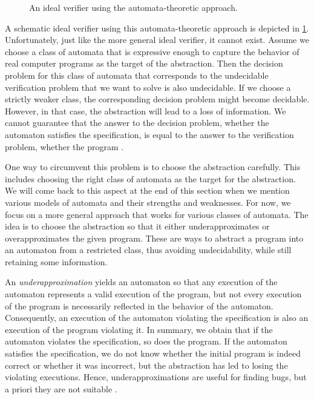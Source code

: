 \documentclass[../../diss.tex]{subfiles}
\begin{document}
\begin{figure}[t]
    \centering%
    
    \caption{An ideal verifier using the automata-theoretic approach.
    }%
    \label{Figure:IntroAutomata}%
\end{figure}

A schematic ideal verifier using this automata-theoretic approach is depicted in \cref{Figure:IntroAutomata}.
Unfortunately, just like the more general ideal verifier, it cannot exist.
Assume we choose a class of automata that is expressive enough to capture the behavior of real computer programs as the target of the abstraction.
Then the decision problem for this class of automata that corresponds to the undecidable verification problem that we want to solve is also undecidable.
If we choose a strictly weaker class, the corresponding decision problem might become decidable.
However, in that case, the abstraction will lead to a loss of information.
We cannot guarantee that the answer to the decision problem, \ie whether the automaton satisfies the specification, is equal to the answer to the verification problem, \ie whether the program .

One way to circumvent this problem is to choose the abstraction carefully.
This includes choosing the right class of automata as the target for the abstraction.
We will come back to this aspect at the end of this section when we mention various models of automata and their strengths and weaknesses.
For now, we focus on a more general approach that works for various classes of automata.
The idea is to choose the abstraction so that it either underapproximates or overapproximates the given program.
These are ways to abstract a program into an automaton from a restricted class, thus avoiding undecidability, while still retaining some information.

An \emph{underapproximation} yields an automaton so that any execution of the automaton represents a valid execution of the program, but not every execution of the program is necessarily reflected in the behavior of the automaton.
Consequently, an execution of the automaton violating the specification is also an execution of the program violating it.
In summary, we obtain that if the automaton violates the specification, so does the program.
If the automaton satisfies the specification, we do not know whether the initial program is indeed correct or whether it was incorrect, but the abstraction has led to losing the violating executions.
Hence, underapproximations are useful for finding bugs, but a priori they are not suitable .
\end{document}
